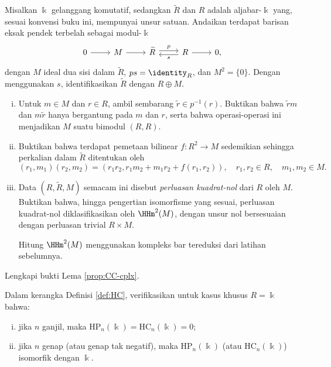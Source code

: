 \begin{Exercises}
	\item Misalkan $\Bbbk$ gelanggang komutatif, sedangkan $\widetilde R$ dan
	$R$ adalah aljabar-$\Bbbk$ yang, sesuai konvensi buku ini, mempunyai unsur
	satuan. Andaikan terdapat barisan eksak pendek terbelah sebagai
	modul-$\Bbbk$
	\[
	\begin{tikzcd}
		0 \arrow[r] & M \arrow[r] & \widetilde R
		\arrow[shift left, r, "p"] &
		R \arrow[r] \arrow[shift left, l, "s"] & 0,
	\end{tikzcd}
	\]
	dengan $M$ ideal dua sisi dalam $\widetilde R$, $ps=\identity_R$, dan
	$M^2=\{0\}$. Dengan menggunakan $s$, identifikasikan
	$\widetilde R$ dengan $R\oplus M$.
	\begin{enumerate}[(i)]
		\item Untuk $m\in M$ dan $r\in R$, ambil sembarang
		$\widetilde r\in p^{-1}(r)$. Buktikan bahwa $\widetilde rm$ dan
		$m\widetilde r$ hanya bergantung pada $m$ dan $r$, serta bahwa
		operasi-operasi ini menjadikan $M$ suatu bimodul $(R,R)$.
		\item Buktikan bahwa terdapat pemetaan bilinear $f:R^2\to M$ sedemikian
		sehingga perkalian dalam $\widetilde R$ ditentukan oleh
		\[
			(r_1,m_1)(r_2,m_2)
			=(r_1r_2,r_1m_2+m_1r_2+f(r_1,r_2)),
			\quad r_1,r_2\in R,\quad m_1,m_2\in M.
		\]
		\item Data $(R,\widetilde R,M)$ semacam ini disebut
		\emph{perluasan kuadrat-nol} dari $R$ oleh $M$. Buktikan bahwa, hingga
		pengertian isomorfisme yang sesuai, perluasan kuadrat-nol
		diklasifikasikan oleh $\HHm^2(M)$, dengan unsur nol
		bersesuaian dengan perluasan trivial $R\times M$.
		\begin{hint}
			Hitung $\HHm^2(M)$ menggunakan kompleks bar tereduksi dari latihan
			sebelumnya.
		\end{hint}
	\end{enumerate}

	\item Lengkapi bukti Lema \ref{prop:CC-cplx}.

	\item Dalam kerangka Definisi \ref{def:HC}, verifikasikan untuk kasus
	khusus $R=\Bbbk$ bahwa:
	\begin{enumerate}[(i)]
		\item jika $n$ ganjil, maka
		$\mathrm{HP}_n(\Bbbk)=\mathrm{HC}_n(\Bbbk)=0$;
		\item jika $n$ genap (atau genap tak negatif), maka
		$\mathrm{HP}_n(\Bbbk)$ (atau $\mathrm{HC}_n(\Bbbk)$) isomorfik dengan
		$\Bbbk$.
	\end{enumerate}


\end{Exercises}
